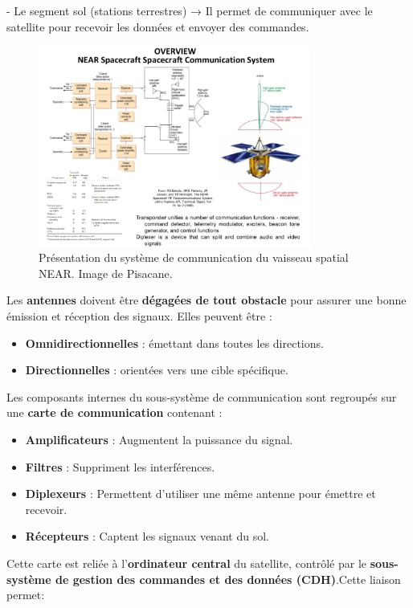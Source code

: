 - Le segment sol (stations terrestres) → Il permet de communiquer avec le satellite pour recevoir les données et envoyer des commandes.
\begin{figure}[H] %
    \centering
    \includegraphics[width=0.8\textwidth]{figures/6-13.jpg}
    
    \caption{Présentation du système de communication du vaisseau spatial NEAR. Image de Pisacane.}
    \label{fig:communication2}
\end{figure}
Les \textbf{antennes} doivent être \textbf{dégagées de tout obstacle} pour assurer une bonne émission et réception des signaux. Elles peuvent être :
\begin{itemize}
    \item \textbf{Omnidirectionnelles} : émettant dans toutes les directions.
    \item \textbf{Directionnelles} : orientées vers une cible spécifique.
\end{itemize}
Les composants internes du sous-système de communication sont regroupés sur une \textbf{carte de communication} contenant :
\begin{itemize}
    \item \textbf{Amplificateurs} : Augmentent la puissance du signal.
    \item \textbf{Filtres} : Suppriment les interférences.
    \item \textbf{Diplexeurs} : Permettent d'utiliser une même antenne pour émettre et recevoir.
    \item \textbf{Récepteurs} : Captent les signaux venant du sol.
\end{itemize}
Cette carte est reliée à l’\textbf{ordinateur central} du satellite, contrôlé par le \textbf{sous-système de gestion des commandes et des données (CDH)}.Cette liaison permet:
